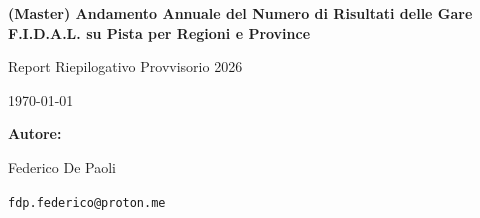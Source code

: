 \documentclass[a4paper, landscape]{article}
\begin{document}
\begin{titlepage}
    \thispagestyle{fancy} %
    \centering
    \vspace*{3cm}
    {\Huge\bfseries (Master) Andamento Annuale del Numero di Risultati delle Gare F.I.D.A.L. su Pista per Regioni e Province\par}
    \vspace{1cm}
    {\Large Report Riepilogativo Provvisorio 2026\par}
    \vspace{0.5cm}
    {\large \today\par}
    \vspace{2cm}
    {\large\textbf{Autore:}\par}
    Federico De Paoli
    \par\vspace{0.3cm}
    {\normalsize\texttt{fdp.federico@proton.me}\par}
\end{titlepage}

\clearpage
\thispagestyle{fancy}
\begin{center}
    \begin{minipage}{0.6\textwidth}
        \begin{abstract}
            Le seguenti pagine riportano il numero totale dei risultati delle 
            gare su pista (indoor e outdoor) conseguiti di anno in anno (dal
            2005 a oggi) dagli atleti, raggruppati nella rispettiva regione e
            provincia della società di appartenenza.
            È possibile vedere e quantificare l'effetto del covid negli anni 2020 e 2021,
            e il nuovo calo di atleti degli ultimi anni, suddiviso per categorie.
            I dati sono stati presi dalle graduatorie F.I.D.A.L. 
            (\url{https://www.fidal.it/graduatorie.php}) e sono aggiornati al 08-09-2026.
            Viene fornita anche una predizione sul numero di risultati che saranno 
            registrati a stagione 2026 conclusa da ogni provincia e regione per
            ogni categoria.

            ~

            \textit{Questo documento è un'iniziativa personale e indipendente, non 
            ufficiale né avallata da F.I.D.A.L. I dati sono aggregati 
            statisticamente (nessun dato nominativo individuale è riportato) e 
            le previsioni di fine stagione sono soggette a possibili imprecisioni.}
        \end{abstract}
    \end{minipage}
\end{center}
\end{document}
